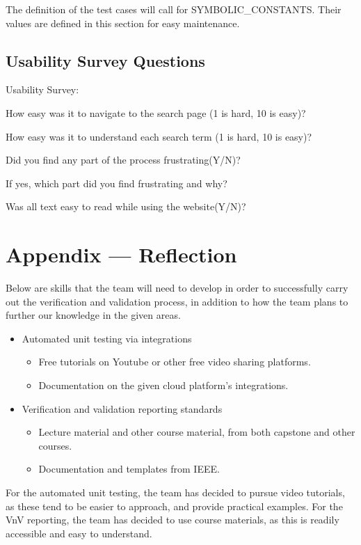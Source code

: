 \documentclass[12pt, titlepage]{article}
\begin{document}
The definition of the test cases will call for SYMBOLIC\_CONSTANTS.
Their values are defined in this section for easy maintenance.

\subsection{Usability Survey Questions}
\label{sec:Appendix}
Usability Survey:

How easy was it to navigate to the search page (1 is hard, 10 is easy)?

How easy was it to understand each search term (1 is hard, 10 is easy)?

Did you find any part of the process frustrating(Y/N)?

If yes, which part did you find frustrating and why?

Was all text easy to read while using the website(Y/N)?


\newpage{}
\section*{Appendix --- Reflection}

Below are skills that the team will need to develop in order to successfully carry out the verification and validation process, in addition to how the team plans to further our knowledge in the given areas.

\begin{itemize}
\item Automated unit testing via integrations
\begin{itemize}
\item Free tutorials on Youtube or other free video sharing platforms.
\item Documentation on the given cloud platform's integrations.
\end{itemize}
\item Verification and validation reporting standards
\begin{itemize}
\item Lecture material and other course material, from both capstone and other courses.
\item Documentation and templates from IEEE.
\end{itemize}
\end{itemize}
For the automated unit testing, the team has decided to pursue video tutorials, as these tend to be easier to approach, and provide practical examples. For the VnV reporting, the team has decided to use course materials, as this is readily accessible and easy to understand.
\end{document}
